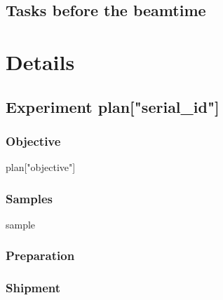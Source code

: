 \documentclass[prl,aps,tighten,amsmath,amssymb,floatfix]{revtex4-1}
\begin{document}
{%
\subsection{Tasks before the beamtime}
{%

\section{Details}

{%

\subsection{Experiment {{plan["serial_id"]}}}

\subsubsection{Objective}
{{plan["objective"]}}

\subsubsection{Samples}
{%
\item {{sample}}
{%

{%
\subsubsection{Preparation}
{%

{%
\subsubsection{Shipment}
{%

{%
}}}}}}}}}}
\end{document}
